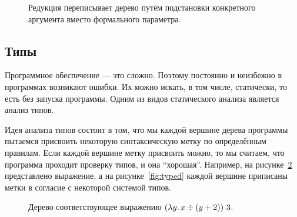 \begin{figure}
    \centering
    \caption{Редукция переписывает дерево путём подстановки конкретного аргумента вместо формального параметра.}
    \label{fig:reduction}
\end{figure}

\subsection{Типы}

Программное обеспечение --- это сложно.
Поэтому постоянно и неизбежно в программах возникают ошибки.
Их можно искать, в том числе, статически, то есть без запуска программы.
Одним из видов статического анализа является анализ типов.

Идея анализа типов состоит в том, что мы каждой вершине дерева программы пытаемся присвоить некоторую синтаксическую метку по определённым правилам.
Если каждой вершине метку присвоить можно, то мы считаем, что программа проходит проверку типов, и она ``хорошая''.
Например, на рисунке\ \ref{fig:to-be-typed} представлено выражение, а на рисунке\ \ref{fig:typed} каждой вершине приписаны метки в согласие с некоторой системой типов.

\begin{figure}
    \centering
    \caption{Дерево соответствующее выражению $(\lambda y\ldotp x \div (y + 2)) ~ 3$.}
    \label{fig:to-be-typed}
\end{figure}

